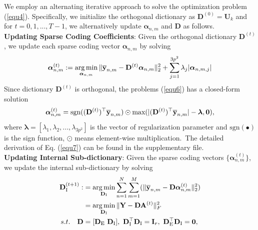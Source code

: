\documentclass[10pt,twocolumn,letterpaper]{article}
\DeclareMathOperator*{\argmin}{arg\,min}
\begin{document}
We employ an alternating iterative approach to solve the optimization problem (\ref{equ4}). Specifically, we initialize the orthogonal dictionary as $\mathbf{D}^{(0)}=\mathbf{U}_{k}$ and for $t=0,1, ...,T-1$, we alternatively update $\bm{\alpha}_{n,m}$ and $\mathbf{D}$ as follows.
\vspace{2mm}\\
\textbf{Updating Sparse Coding Coefficients}: Given the orthogonal dictionary $\textbf{D}^{(t)}$, we update each sparse coding vector $\bm{\alpha}_{n,m}$ by solving
\vspace{-4mm}
\begin{equation}\label{equ6}\vspace{-2mm}
\begin{split}
\bm{\alpha}_{n,m}^{(t)}:=\argmin_{\bm{\alpha}_{n,m}}
\|\mathbf{\overline{y}}_{n,m}-\mathbf{D}^{(t)}\bm{\alpha}_{n,m}\|_{2}^{2}+\sum_{j=1}^{3p^{2}}\lambda_{j}|\bm{\alpha}_{n,m,j}|
\end{split}
\end{equation}
Since dictionary $\mathbf{D}^{(t)}$ is orthogonal, the problems (\ref{equ6}) has a closed-form solution
\vspace{-1mm}
\begin{equation}\label{equ7}\vspace{-0mm}
\bm{\alpha}_{n,m}^{(t)}= \text{sgn}((\mathbf{D}^{(t)})^{\top}\mathbf{\overline{y}}_{n,m})\odot \text{max}(|(\mathbf{D}^{(t)})^{\top}\mathbf{\overline{y}}_{n,m}|-\bm{\lambda},\mathbf{0}),
\end{equation}
where $\bm{\lambda} = [\lambda_{1},\lambda_{2},...,\lambda_{3p^2}]$ is the vector of regularization parameter and $\text{sgn}(\bullet)$ is the sign function, $\odot$ means element-wise multiplication.\ The detailed derivation of Eq. (\ref{equ7}) can be found in the supplementary file.
\vspace{2mm}\\
\textbf{Updating Internal Sub-dictionary}: Given the sparse coding vectors $\{\bm{\alpha}_{n,m}^{(t)}\}$, we update the internal sub-dictionary by solving
\vspace{-2mm}
\begin{equation}\label{equ8} \vspace{-2mm}
\begin{split}
\textbf{D}_{\text{I}}^{(t+1)}
:
&
=
\argmin_{\textbf{D}_{\text{I}}}
\sum_{n=1}^{N}\sum_{m=1}^{M}(\|\mathbf{\overline{y}}_{n,m}-\mathbf{D}\bm{\alpha}_{n,m}^{(t)}\|_{2}^{2})
\\
&
=
\argmin_{\textbf{D}_{\text{I}}}
\|\mathbf{Y}-\mathbf{D}\mathbf{A}^{(t)}\|_{F}^{2}
\\
s.t.
\quad
\mathbf{D}
&
=
[\mathbf{D}_{\text{E}}\ \mathbf{D}_{\text{I}}],\ \mathbf{D}_{\text{I}}^{\top}\mathbf{D}_{\text{I}} = \mathbf{I}_{r},\ \mathbf{D}_{\text{E}}^{\top}\mathbf{D}_{\text{I}} = \mathbf{0},
\end{split}
\end{equation}
\end{document}
